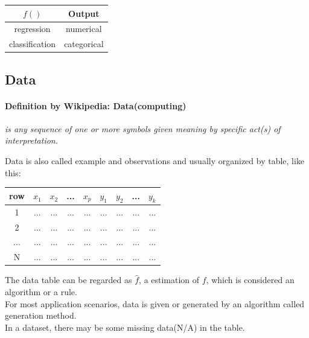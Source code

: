 \documentclass{article}
\begin{document}
{{{            \begin{center}{
                \begin{tabular}{|c|c|}
                \hline
                $f()$ & Output\\
                \hline
                regression & numerical \\
                \hline
                classification & categorical \\
                \hline
                \end{tabular}
            }
            \end{center}   
        }
    }
    \subsection{Data}{
        \paragraph{Definition by Wikipedia: Data(computing)}{
            \textit{is any sequence of one or more symbols given meaning by specific act(s) of interpretation.\\
        }
        
        Data is also called example and observations and usually organized by table, like this:

        \begin{center}{
            \begin{tabular}{|c|c|c|c|c|c|c|c|c|}
            \hline
            row & $x_1$ & $x_2$ & ... & $x_p$ & $y_1$ & $y_2$ & ... & $y_k$\\
            \hline
            1 & ... & ... & ... & ... & ... & ... & ... & ... \\
            \hline
            2 & ... & ... & ... & ... & ... & ... & ... & ... \\
            \hline
            ... & ... & ... & ... & ... & ... & ... & ... & ... \\
            \hline
            N & ... & ... & ... & ... & ... & ... & ... & ... \\
            \hline
            \end{tabular}
        }
        \end{center} 

        The data table can be regarded as \(\hat{f}\), a estimation of $f$, which is considered an algorithm or a rule.\\
        For most application scenarios, data is given or generated by an algorithm called generation method.\\
        In a dataset, there may be some missing data(N/A) in the table.\\
    }

}}
\end{document}
